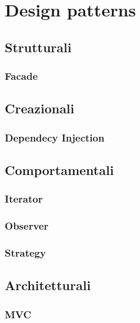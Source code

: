 \newpage
\section{Design patterns}

\subsection{Strutturali}
\subsubsection{Facade}

\subsection{Creazionali}
\subsubsection{Dependecy Injection}

\subsection{Comportamentali}
\subsubsection{Iterator}
\subsubsection{Observer}
\subsubsection{Strategy}

\subsection{Architetturali}
\subsubsection{MVC}

